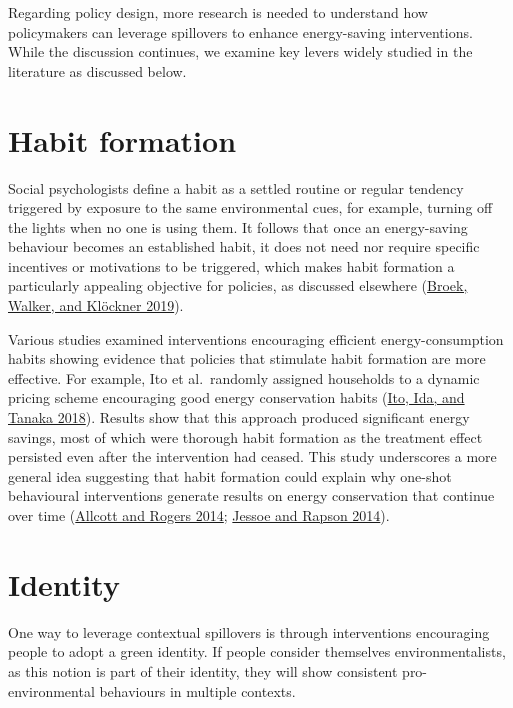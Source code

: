 \documentclass[
  12pt,
  captions=heading]{scrreport}
\begin{document}
Regarding policy design, more research is needed to understand how
policymakers can leverage spillovers to enhance energy-saving
interventions. While the discussion continues, we examine key levers
widely studied in the literature as discussed below.

\hypertarget{habit-formation}{%
\section{Habit formation}\label{habit-formation}}

Social psychologists define a habit as a settled routine or regular
tendency triggered by exposure to the same environmental cues, for
example, turning off the lights when no one is using them. It follows
that once an energy-saving behaviour becomes an established habit, it
does not need nor require specific incentives or motivations to be
triggered, which makes habit formation a particularly appealing
objective for policies, as discussed elsewhere
(\protect\hyperlink{ref-van2019drivers}{Broek, Walker, and Klöckner
2019}).

Various studies examined interventions encouraging efficient
energy-consumption habits showing evidence that policies that stimulate
habit formation are more effective. For example, Ito et al.~randomly
assigned households to a dynamic pricing scheme encouraging good energy
conservation habits (\protect\hyperlink{ref-ito2018moral}{Ito, Ida, and
Tanaka 2018}). Results show that this approach produced significant
energy savings, most of which were thorough habit formation as the
treatment effect persisted even after the intervention had ceased. This
study underscores a more general idea suggesting that habit formation
could explain why one-shot behavioural interventions generate results on
energy conservation that continue over time
(\protect\hyperlink{ref-allcott2014short}{Allcott and Rogers 2014};
\protect\hyperlink{ref-jessoe2014knowledge}{Jessoe and Rapson 2014}).

\hypertarget{identity}{%
\section{Identity}\label{identity}}

One way to leverage contextual spillovers is through interventions
encouraging people to adopt a green identity. If people consider
themselves environmentalists, as this notion is part of their identity,
they will show consistent pro-environmental behaviours in multiple
contexts.
\end{document}
